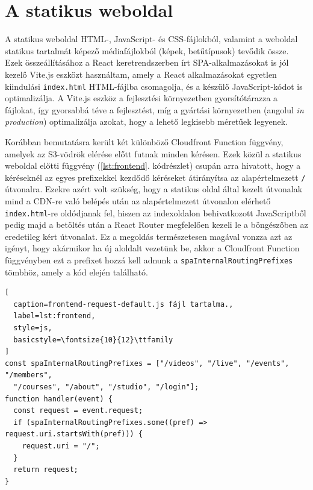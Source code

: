 \section{A statikus weboldal}

A statikus weboldal HTML-, JavaScript- és CSS-fájlokból, valamint a weboldal statikus tartalmát képező médiafájlokból (képek, betűtípusok) tevődik össze. Ezek összeállításához a React keretrendszerben írt SPA-alkalmazásokat is jól kezelő Vite.js eszközt használtam, amely a React alkalmazásokat egyetlen kiindulási \verb|index.html| HTML-fájlba csomagolja, és a készülő JavaScript-kódot is optimalizálja. A Vite.js eszköz a fejlesztési környezetben gyorsítótárazza a fájlokat, így gyorsabbá téve a fejlesztést, míg a gyártási környezetben (angolul \emph{in production}) optimalizálja azokat, hogy a lehető legkisebb méretűek legyenek.

Korábban bemutatásra került két különböző Cloudfront Function függvény, amelyek az S3-vödrök elérése előtt futnak minden kérésen. Ezek közül a statikus weboldal előtti függvény (\ref{lst:frontend}. kódrészlet) csupán arra hivatott, hogy a kéréseknél az egyes prefixekkel kezdődő kéréseket átirányítsa az alapértelmezett \verb|/| útvonalra. Ezekre azért volt szükség, hogy a statikus oldal által kezelt útvonalak mind a CDN-re való belépés után az alapértelmezett útvonalon elérhető \verb|index.html|-re oldódjanak fel, hiszen az indexoldalon behivatkozott JavaScriptből pedig majd a betöltés után a React Router megfelelően kezeli le a böngészőben az eredetileg kért útvonalat. Ez a megoldás természetesen magával vonzza azt az igényt, hogy akármikor ha új aloldalt vezetünk be, akkor a Cloudfront Function függvényben ezt a prefixet hozzá kell adnunk a \verb|spaInternalRoutingPrefixes| tömbhöz, amely a kód elején található.

\begin{minipage}{0.92\textwidth}
  \begin{lstlisting}[
  caption=frontend-request-default.js fájl tartalma.,
  label=lst:frontend,
  style=js,
  basicstyle=\fontsize{10}{12}\ttfamily
]
const spaInternalRoutingPrefixes = ["/videos", "/live", "/events", "/members", 
  "/courses", "/about", "/studio", "/login"];
function handler(event) {
  const request = event.request;
  if (spaInternalRoutingPrefixes.some((pref) => request.uri.startsWith(pref))) {
    request.uri = "/";
  }
  return request;
}
\end{lstlisting}
\end{minipage}

